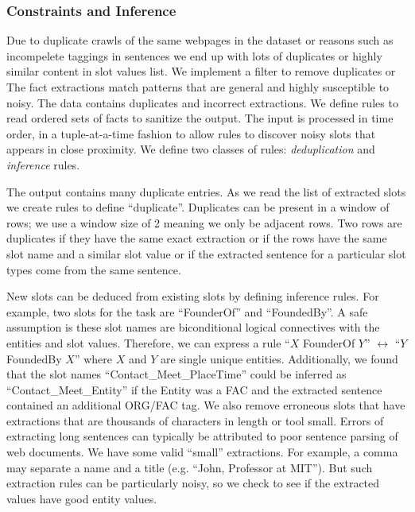 \subsubsection{Constraints and Inference}%

Due to duplicate crawls of the same webpages in the dataset or reasons such as incompelete taggings in sentences we end up with lots of duplicates or highly similar content in slot values list. 
We implement a filter to remove duplicates or The fact extractions match patterns that are general and highly susceptible to noisy.
The data contains duplicates and incorrect extractions.
We define rules to read ordered sets of facts to sanitize the output.
The input is processed in time order, in a tuple-at-a-time fashion to allow rules to discover noisy slots 
that appears in close proximity.
We define two classes of rules: \textit{deduplication} and \textit{inference} rules.

The output contains many duplicate entries.
As we read the list of extracted slots we create rules to define ``duplicate''.
Duplicates can be present in a window of rows; we use a window size of 2 meaning we only be adjacent rows.
Two rows are duplicates if they have the same exact extraction or if the rows have the same slot name and a similar slot value or if the extracted sentence for a particular slot types come from the same sentence.

New slots can be deduced from existing slots by defining inference rules.
For example, two slots for the task are ``FounderOf'' and ``FoundedBy''.
A safe assumption is these slot names are biconditional logical connectives with the entities and slot values.
Therefore, we can express a rule ``$X$ FounderOf $Y$'' $\leftrightarrow$ ``$Y$ FoundedBy $X$'' where $X$ and $Y$ are single unique entities.
Additionally, we found that the slot names ``Contact\_Meet\_PlaceTime'' could be inferred as ``Contact\_Meet\_Entity'' if the Entity was a FAC and the extracted sentence contained an additional ORG/FAC tag.
We also remove erroneous slots that have extractions that are thousands of characters in length or tool small.
Errors of extracting long sentences can typically be attributed to poor sentence parsing of web documents.
We have some valid ``small'' extractions. For example, a comma may separate a name and a title (e.g. ``John, Professor at MIT'').
But such extraction rules can be particularly noisy, so we check to see if the extracted values have good entity values.
